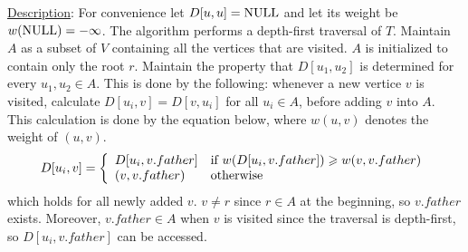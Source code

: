 \documentclass{article}
\begin{document}




\noindent\underline{Description}: For convenience let $D[u,u]=\textup{NULL}$ and let its weight be $w(\textup{NULL})=-\infty$. The algorithm performs a depth-first traversal of $T$. Maintain $A$ as a subset of $V$ containing all the vertices that are visited. $A$ is initialized to contain only the root $r$. Maintain the property that $D[u_1,u_2]$ is determined for every $u_1,u_2\in A$. This is done by the following: whenever a new vertice $v$ is visited, calculate $D[u_i,v]=D[v,u_i]$ for all $u_i\in A$, before adding $v$ into $A$. This calculation is done by the equation below, where $w(u,v)$ denotes the weight of $(u,v)$.
\begin{equation*}
D[u_i,v]=\left\{\begin{array}{ll}D[u_i,v.father]&\textup{if }w(D[u_i,v.father])\geqslant w(v,v.father)\\(v,v.father)&\textup{otherwise}\end{array}\right.
\end{equation*}
which holds for all newly added $v$. $v\neq r$ since $r\in A$ at the beginning, so $v.father$ exists. Moreover, $v.father\in A$ when $v$ is visited since the traversal is depth-first, so $D[u_i,v.father]$ can be accessed.
\end{document}
